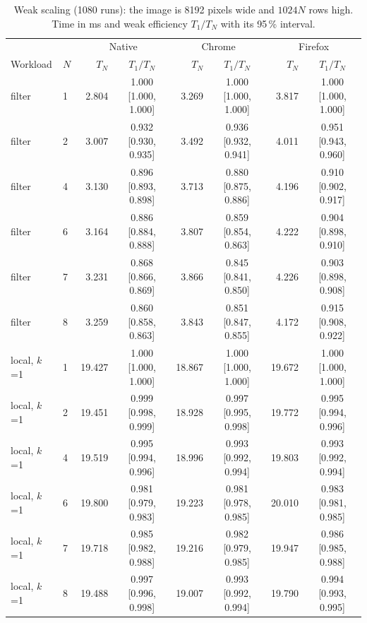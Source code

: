 \begin{table}[htbp]
\caption{Weak scaling (1080 runs): the image is 8192 pixels wide and $1024N$ rows high. Time in ms and weak efficiency $T_1/T_N$ with its 95\,\% interval.}\label{tab:weak}
\centering\footnotesize
\begin{tabular}{llrcrcrc}
\toprule
 &  & \multicolumn{2}{c}{Native} & \multicolumn{2}{c}{Chrome} & \multicolumn{2}{c}{Firefox} \\
Workload & $N$ & $T_N$ & $T_1/T_N$ & $T_N$ & $T_1/T_N$ & $T_N$ & $T_1/T_N$ \\
\midrule
filter & 1 & 2.804 & 1.000 [1.000, 1.000] & 3.269 & 1.000 [1.000, 1.000] & 3.817 & 1.000 [1.000, 1.000] \\
filter & 2 & 3.007 & 0.932 [0.930, 0.935] & 3.492 & 0.936 [0.932, 0.941] & 4.011 & 0.951 [0.943, 0.960] \\
filter & 4 & 3.130 & 0.896 [0.893, 0.898] & 3.713 & 0.880 [0.875, 0.886] & 4.196 & 0.910 [0.902, 0.917] \\
filter & 6 & 3.164 & 0.886 [0.884, 0.888] & 3.807 & 0.859 [0.854, 0.863] & 4.222 & 0.904 [0.898, 0.910] \\
filter & 7 & 3.231 & 0.868 [0.866, 0.869] & 3.866 & 0.845 [0.841, 0.850] & 4.226 & 0.903 [0.898, 0.908] \\
filter & 8 & 3.259 & 0.860 [0.858, 0.863] & 3.843 & 0.851 [0.847, 0.855] & 4.172 & 0.915 [0.908, 0.922] \\
\midrule
local, $k$=1 & 1 & 19.427 & 1.000 [1.000, 1.000] & 18.867 & 1.000 [1.000, 1.000] & 19.672 & 1.000 [1.000, 1.000] \\
local, $k$=1 & 2 & 19.451 & 0.999 [0.998, 0.999] & 18.928 & 0.997 [0.995, 0.998] & 19.772 & 0.995 [0.994, 0.996] \\
local, $k$=1 & 4 & 19.519 & 0.995 [0.994, 0.996] & 18.996 & 0.993 [0.992, 0.994] & 19.803 & 0.993 [0.992, 0.994] \\
local, $k$=1 & 6 & 19.800 & 0.981 [0.979, 0.983] & 19.223 & 0.981 [0.978, 0.985] & 20.010 & 0.983 [0.981, 0.985] \\
local, $k$=1 & 7 & 19.718 & 0.985 [0.982, 0.988] & 19.216 & 0.982 [0.979, 0.985] & 19.947 & 0.986 [0.985, 0.988] \\
local, $k$=1 & 8 & 19.488 & 0.997 [0.996, 0.998] & 19.007 & 0.993 [0.992, 0.994] & 19.790 & 0.994 [0.993, 0.995] \\
\bottomrule
\end{tabular}
\end{table}
